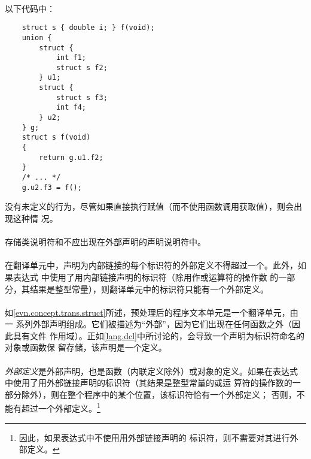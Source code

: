 {\paragraph{}
\ex* 以下代码中：
\begin{lstlisting}
    struct s { double i; } f(void);
    union {
        struct {
            int f1;
            struct s f2;
        } u1;
        struct {
            struct s f3;
            int f4;
        } u2;
    } g;
    struct s f(void)
    {
        return g.u1.f2;
    }
    /* ... */
    g.u2.f3 = f();
\end{lstlisting}
没有未定义的行为，尽管如果直接执行赋值（而不使用函数调用获取值），则会出现这种情
况。

\syntax
\paragraph{}

\constraint
\paragraph{}
存储类说明符和不应出现在外部声明的声明说明符中。

\paragraph{}
在翻译单元中，声明为内部链接的每个标识符的外部定义不得超过一个。此外，如果表达式
中使用了用内部链接声明的标识符（除用作或运算符的操作数
的一部分，其结果是整型常量），则翻译单元中的标识符只能有一个外部定义。

\semantic
\paragraph{}
如\ref{evn.concept.trans.struct}所述，预处理后的程序文本单元是一个翻译单元，由一
系列外部声明组成。它们被描述为``外部''，因为它们出现在任何函数之外（因此具有文件
作用域）。正如\ref{lang.dcl}中所讨论的，会导致一个声明为标识符命名的对象或函数保
留存储，该声明是一个定义。

\paragraph{}
\textit{外部定义}是外部声明，也是函数（内联定义除外）或对象的定义。如果在表达式
中使用了用外部链接声明的标识符（其结果是整型常量的或运
算符的操作数的一部分除外），则在整个程序中的某个位置，该标识符恰有一个外部定义；
否则，不能有超过一个外部定义。\footnote{因此，如果表达式中不使用用外部链接声明的
标识符，则不需要对其进行外部定义。}

}
